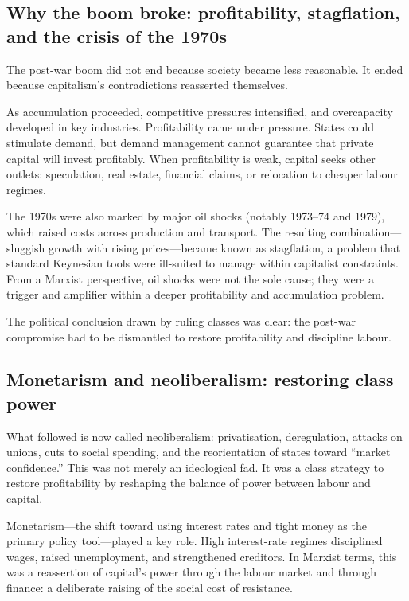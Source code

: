 \subsection{Why the boom broke: profitability, stagflation, and the crisis of the 1970s}
\label{subsec:1970s-crisis}

The post-war boom did not end because society became less reasonable. It ended because capitalism's contradictions
reasserted themselves.

As accumulation proceeded, competitive pressures intensified, and overcapacity developed in key industries.
Profitability came under pressure. States could stimulate demand, but demand management cannot guarantee that
private capital will invest profitably. When profitability is weak, capital seeks other outlets: speculation,
real estate, financial claims, or relocation to cheaper labour regimes.

The 1970s were also marked by major oil shocks (notably 1973--74 and 1979), which raised costs across production
and transport. The resulting combination—sluggish growth with rising prices—became known as stagflation, a problem
that standard Keynesian tools were ill-suited to manage within capitalist constraints. From a Marxist perspective,
oil shocks were not the sole cause; they were a trigger and amplifier within a deeper profitability and accumulation
problem.

The political conclusion drawn by ruling classes was clear: the post-war compromise had to be dismantled to restore
profitability and discipline labour.

\subsection{Monetarism and neoliberalism: restoring class power}
\label{subsec:neoliberal-turn}

What followed is now called neoliberalism: privatisation, deregulation, attacks on unions, cuts to social spending,
and the reorientation of states toward ``market confidence.'' This was not merely an ideological fad. It was a class
strategy to restore profitability by reshaping the balance of power between labour and capital.\cite{HarveyNeoliberalism}

Monetarism—the shift toward using interest rates and tight money as the primary policy tool—played a key role.
High interest-rate regimes disciplined wages, raised unemployment, and strengthened creditors. In Marxist terms,
this was a reassertion of capital's power through the labour market and through finance: a deliberate raising of the
social cost of resistance.

